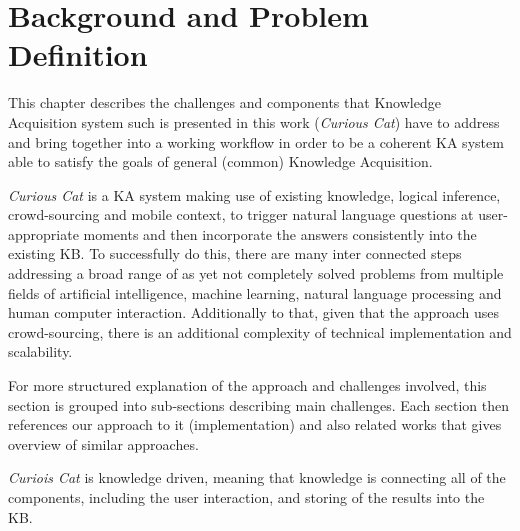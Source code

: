 \chapter{Background and Problem Definition}
This chapter describes the challenges and components that Knowledge Acquisition 
system such is presented in this work (\emph{Curious Cat}) have to address and 
bring together into a working workflow in order to be a coherent KA system able 
to satisfy the goals of general (common) Knowledge Acquisition. 

\emph{Curious Cat} is a KA system making use of existing knowledge, 
logical inference, crowd-sourcing and mobile context, to trigger natural language
questions at user-appropriate moments and then incorporate the answers consistently
into the existing KB. To successfully do this, there are many inter connected
steps addressing a broad range of as yet not completely solved problems from
multiple fields of artificial intelligence, machine learning, natural language
processing and human computer interaction. Additionally to that, given
that the approach uses crowd-sourcing, there is an additional complexity
of technical implementation and scalability. 

For more structured explanation of the approach and challenges involved, this
section is grouped into sub-sections describing main challenges. Each section
then references our approach to it (implementation) and also related works that
gives overview of similar approaches.

\emph{Curiois Cat} is knowledge driven, meaning that knowledge is connecting
all of the components, including the user interaction, and storing of the
results into the KB.
 
